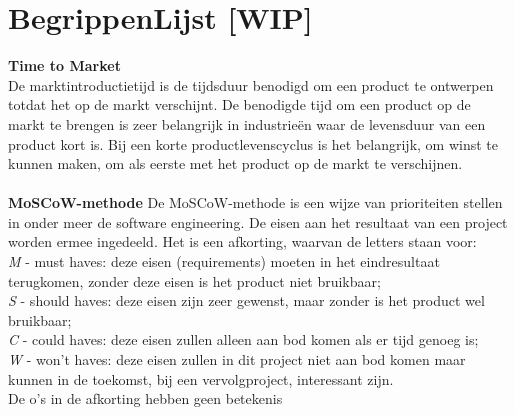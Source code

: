 
\chapter{BegrippenLijst [WIP]}


\textbf{Time to Market}\\
De marktintroductietijd is de tijdsduur benodigd om een product te ontwerpen totdat het op de markt verschijnt. De benodigde tijd om een product op de markt te brengen is zeer belangrijk in industrieën waar de levensduur van een product kort is. Bij een korte productlevenscyclus is het belangrijk, om winst te kunnen maken, om als eerste met het product op de markt te verschijnen.\\
\\
\textbf{MoSCoW-methode}
De MoSCoW-methode is een wijze van prioriteiten stellen in onder meer de software engineering. De eisen aan het resultaat van een project worden ermee ingedeeld. Het is een afkorting, waarvan de letters staan voor:\\
\textit{M} - must haves: deze eisen (requirements) moeten in het eindresultaat terugkomen, zonder deze eisen is het product niet bruikbaar;\\
\textit{S} - should haves: deze eisen zijn zeer gewenst, maar zonder is het product wel bruikbaar;\\
\textit{C} - could haves: deze eisen zullen alleen aan bod komen als er tijd genoeg is;\\
\textit{W} - won't haves: deze eisen zullen in dit project niet aan bod komen maar kunnen in de toekomst, bij een vervolgproject, interessant zijn.\\
De o's in de afkorting hebben geen betekenis
